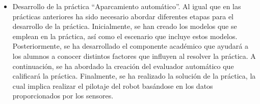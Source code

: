 \begin{itemize}
\item Desarrollo de la práctica ``Aparcamiento automático''. Al igual que en las prácticas anteriores ha sido necesario abordar diferentes etapas para el desarrollo de la práctica. Inicialmente, se han creado los modelos que se emplean en la práctica, así como el escenario que incluye estos modelos. Posteriormente, se ha desarrollado el componente académico que ayudará a los alumnos a conocer distintos factores que influyen al resolver la práctica. A continuación, se ha abordado la creación del evaluador automático que calificará la práctica. Finalmente, se ha realizado la solución de la práctica, la cual implica realizar el pilotaje del robot basándose en los datos proporcionados por los sensores.
\end{itemize}
